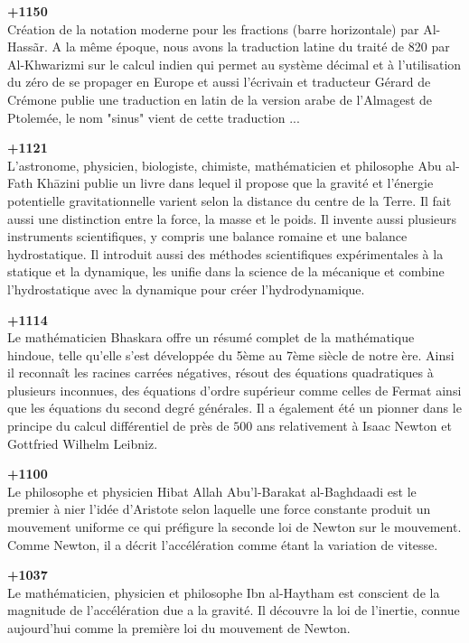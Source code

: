 \textbf{+1150}\\
Création de la notation moderne pour les fractions (barre horizontale) par Al-Hassãr. A la même époque, nous avons la traduction latine du traité de 820 par Al-Khwarizmi sur le calcul indien qui permet au système décimal et à l'utilisation du zéro de se propager en Europe et aussi l'écrivain et traducteur Gérard de Crémone publie une traduction en latin de la version arabe de l'Almagest de Ptolemée, le nom "sinus" vient de cette traduction ...

\textbf{+1121}\\
L'astronome, physicien, biologiste, chimiste, mathématicien et philosophe Abu al-Fath Khāzini publie un livre dans lequel il propose que la gravité et l'énergie potentielle gravitationnelle varient selon la distance du centre de la Terre. Il fait aussi une distinction entre la force, la masse et le poids. Il invente aussi plusieurs instruments scientifiques, y compris une balance romaine et une balance hydrostatique. Il introduit aussi des méthodes scientifiques expérimentales à la statique et la dynamique, les unifie dans la science de la mécanique et combine l'hydrostatique avec la dynamique pour créer l'hydrodynamique.

\textbf{+1114}\\
Le mathématicien Bhaskara offre un résumé complet de la mathématique hindoue, telle qu'elle s'est développée du 5ème au 7ème siècle de notre ère. Ainsi il  reconnaît les racines carrées négatives, résout des équations quadratiques à plusieurs inconnues, des équations d'ordre supérieur comme celles de Fermat ainsi que les équations du second degré générales. Il a également été un pionner dans le principe du calcul différentiel de près de $500$ ans relativement à Isaac Newton et Gottfried Wilhelm Leibniz.

\textbf{+1100}\\
Le philosophe et physicien Hibat Allah Abu'l-Barakat al-Baghdaadi est le premier à nier l'idée d'Aristote selon laquelle une force constante produit un mouvement uniforme ce qui préfigure la seconde loi de Newton sur le mouvement. Comme Newton, il a décrit l'accélération comme étant la variation de vitesse.

\textbf{+1037}\\
Le mathématicien, physicien et philosophe Ibn al-Haytham est conscient de la magnitude de l'accélération due a la gravité. Il découvre la loi de l'inertie, connue aujourd'hui comme la première loi du mouvement de Newton.

